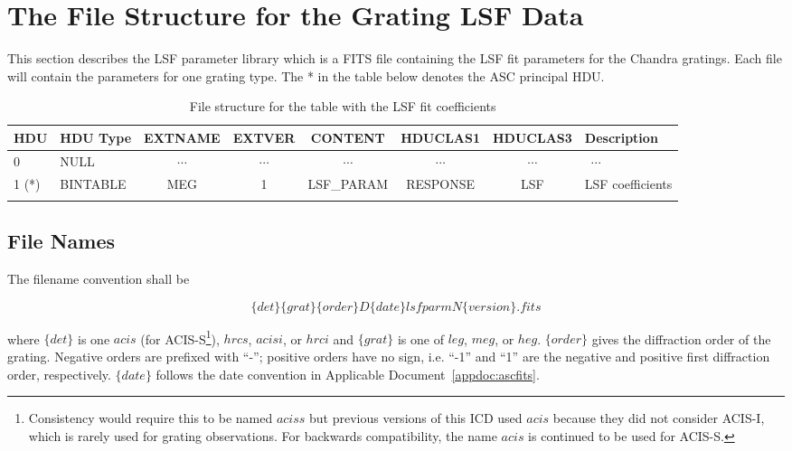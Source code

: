 \documentclass[twoside]{article}
\def\nodata{ ~$\cdots$~ }
\begin{document}

\section{The File Structure for the Grating LSF Data}

This section describes the LSF parameter library which is a FITS file
containing the LSF fit parameters for the Chandra gratings. Each file
will contain the parameters for one grating type.
The * in the table below  denotes the ASC principal HDU.

\begin{table}[h]
{\footnotesize
\noindent\begin{tabular}{|llcccccp{1.2in}|}\hline
HDU
& \sc HDU Type
& \sc EXTNAME
& \sc EXTVER
& \sc CONTENT
& \sc HDUCLAS1
& \sc HDUCLAS3
& Description
\\
\hline
%
0 
& \sc NULL
& \nodata
& \nodata
& \nodata
& \nodata
& \nodata
& \nodata
\\
%
1 (*)
& \sc BINTABLE
& \sc MEG
& 1
& \sc LSF\_PARAM
& RESPONSE
& \sc LSF
& LSF coefficients
\\
%
\\\hline
%
\end{tabular}
}%
\caption{File structure for the table with the LSF fit coefficients}
\label{tab:fstruct}
\end{table}
%

\subsection{File Names}

The filename convention shall be

$$\{ det\} \{grat\}\{order\}D \{date\} lsfparmN\{version\}.fits$$

where $\{det\}$ is one  $acis$ (for ACIS-S\footnote{Consistency would require this to be named $aciss$ but previous versions of this ICD used $acis$ because they did not consider ACIS-I, which is rarely used for grating observations. For backwards compatibility, the name $acis$ is continued to be used for ACIS-S.}), $hrcs$, $acisi$, or $hrci$ and $\{grat\}$ is one of $leg$, $meg$,
or $heg$. $\{order\}$ gives the diffraction order of the grating. Negative orders are prefixed with ``-''; positive orders have no sign, i.e. ``-1'' and ``1'' are the negative and positive first diffraction order, respectively.
$\{date\}$ follows the date convention in Applicable
Document~\ref{appdoc:ascfits}. 
\end{document}
